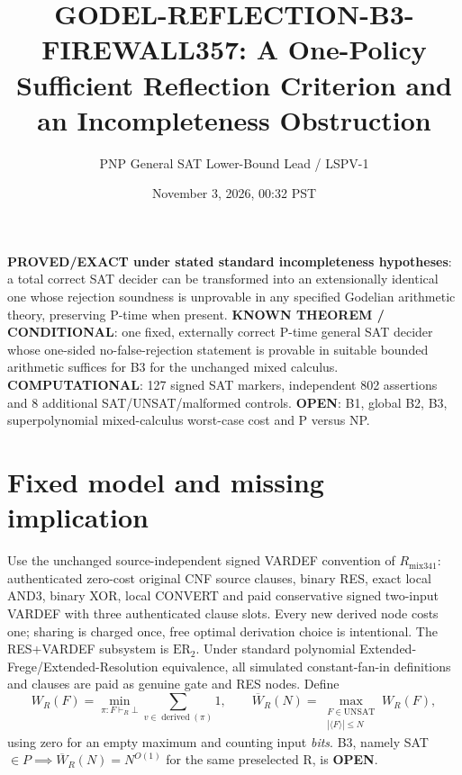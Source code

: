 \documentclass[11pt]{article}
\title{GODEL-REFLECTION-B3-FIREWALL357: A One-Policy Sufficient Reflection Criterion and an Incompleteness Obstruction}
\author{PNP General SAT Lower-Bound Lead / LSPV-1}
\date{November 3, 2026, 00:32 PST}
\begin{document}
\maketitle
\noindent\textbf{PROVED/EXACT under stated standard incompleteness hypotheses}: a total correct SAT decider can be transformed into an extensionally identical one whose rejection soundness is unprovable in any specified Godelian arithmetic theory, preserving P-time when present. \textbf{KNOWN THEOREM / CONDITIONAL}: one fixed, externally correct P-time general SAT decider whose one-sided no-false-rejection statement is provable in suitable bounded arithmetic suffices for B3 for the unchanged mixed calculus. \textbf{COMPUTATIONAL}: 127 signed SAT markers, independent 802 assertions and 8 additional SAT/UNSAT/malformed controls. \textbf{OPEN}: B1, global B2, B3, superpolynomial mixed-calculus worst-case cost and P versus NP.

\section*{Fixed model and missing implication}
Use the unchanged source-independent signed VARDEF convention of $R_{\mathrm{mix341}}$: authenticated zero-cost original CNF source clauses, binary RES, exact local AND3, binary XOR, local CONVERT and paid conservative signed two-input VARDEF with three authenticated clause slots. Every new derived node costs one; sharing is charged once, free optimal derivation choice is intentional. The RES+VARDEF subsystem is $\mathrm{ER}_2$. Under standard polynomial Extended-Frege/Extended-Resolution equivalence, all simulated constant-fan-in definitions and clauses are paid as genuine gate and RES nodes. Define
\[
W_R(F)=\min_{\pi:F\vdash_R\bot}\sum_{v\in\operatorname{derived}(\pi)}1,\qquad
\overline W_R(N)=\max_{\substack{F\in\mathrm{UNSAT}\\|\langle F\rangle|\le N}}W_R(F),
\]
using zero for an empty maximum and counting input \emph{bits}. B3, namely SAT$\in P\implies\overline W_R(N)=N^{O(1)}$ for the same preselected R, is \textbf{OPEN}.
\end{document}
